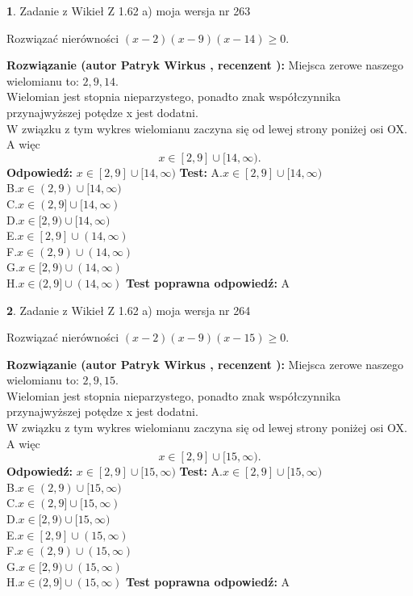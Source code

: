 \documentclass[12pt, a4paper]{article}
\theoremstyle{definition} %
\newtheorem{zad}{}
\newcommand{\zadStart}[1]{\begin{zad}#1\newline}
\newcommand{\zadStop}{\end{zad}}
\newcommand{\rozwStart}[2]{\noindent \textbf{Rozwiązanie (autor #1 , recenzent #2): }\newline}
\newcommand{\rozwStop}{\newline}
\newcommand{\odpStart}{\noindent \textbf{Odpowiedź:}\newline}
\newcommand{\odpStop}{\newline}
\newcommand{\testStart}{\noindent \textbf{Test:}\newline}
\newcommand{\testStop}{\newline}
\newcommand{\kluczStart}{\noindent \textbf{Test poprawna odpowiedź:}\newline}
\newcommand{\kluczStop}{\newline}
\begin{document}
\zadStart{Zadanie z Wikieł Z 1.62 a) moja wersja nr 263}

Rozwiązać nierówności $(x-2)(x-9)(x-14)\ge0$.
\zadStop
\rozwStart{Patryk Wirkus}{}
Miejsca zerowe naszego wielomianu to: $2, 9, 14$.\\
Wielomian jest stopnia nieparzystego, ponadto znak współczynnika przy\linebreak najwyższej potędze x jest dodatni.\\ W związku z tym wykres wielomianu zaczyna się od lewej strony poniżej osi OX. A więc $$x \in [2,9] \cup [14,\infty).$$
\rozwStop
\odpStart
$x \in [2,9] \cup [14,\infty)$
\odpStop
\testStart
A.$x \in [2,9] \cup [14,\infty)$\\
B.$x \in (2,9) \cup [14,\infty)$\\
C.$x \in (2,9] \cup [14,\infty)$\\
D.$x \in [2,9) \cup [14,\infty)$\\
E.$x \in [2,9] \cup (14,\infty)$\\
F.$x \in (2,9) \cup (14,\infty)$\\
G.$x \in [2,9) \cup (14,\infty)$\\
H.$x \in (2,9] \cup (14,\infty)$
\testStop
\kluczStart
A
\kluczStop



\zadStart{Zadanie z Wikieł Z 1.62 a) moja wersja nr 264}

Rozwiązać nierówności $(x-2)(x-9)(x-15)\ge0$.
\zadStop
\rozwStart{Patryk Wirkus}{}
Miejsca zerowe naszego wielomianu to: $2, 9, 15$.\\
Wielomian jest stopnia nieparzystego, ponadto znak współczynnika przy\linebreak najwyższej potędze x jest dodatni.\\ W związku z tym wykres wielomianu zaczyna się od lewej strony poniżej osi OX. A więc $$x \in [2,9] \cup [15,\infty).$$
\rozwStop
\odpStart
$x \in [2,9] \cup [15,\infty)$
\odpStop
\testStart
A.$x \in [2,9] \cup [15,\infty)$\\
B.$x \in (2,9) \cup [15,\infty)$\\
C.$x \in (2,9] \cup [15,\infty)$\\
D.$x \in [2,9) \cup [15,\infty)$\\
E.$x \in [2,9] \cup (15,\infty)$\\
F.$x \in (2,9) \cup (15,\infty)$\\
G.$x \in [2,9) \cup (15,\infty)$\\
H.$x \in (2,9] \cup (15,\infty)$
\testStop
\kluczStart
A
\kluczStop
\end{document}
